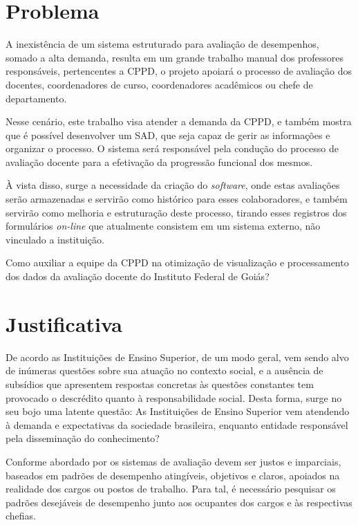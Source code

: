       
      
\section{Problema}
    A inexistência de um sistema estruturado para avaliação de desempenhos, somado a alta demanda, resulta em um grande trabalho manual dos professores responsáveis, pertencentes a CPPD, o projeto apoiará o processo de avaliação dos docentes, coordenadores de curso, coordenadores acadêmicos ou chefe de departamento.
    
    Nesse cenário, este trabalho visa atender a demanda da CPPD, e também mostra que é possível desenvolver um SAD, que seja capaz de gerir as informações e organizar o processo. O sistema será responsável pela condução do processo de avaliação docente para a efetivação da progressão funcional dos mesmos.
    
    À vista disso, surge a necessidade da criação do \textit{software}, onde estas avaliações serão armazenadas e servirão como histórico para esses colaboradores, e também servirão como melhoria e estruturação deste processo, tirando esses registros dos formulários \textit{on-line} que atualmente consistem em um sistema externo, não vinculado a instituição.
    
    Como auxiliar a equipe da CPPD na otimização de visualização e processamento dos dados da avaliação docente do Instituto Federal de Goiás?


\section{Justificativa}
    De acordo  as Instituições de Ensino Superior, de um modo geral, vem sendo alvo de inúmeras questões sobre sua atuação no contexto social, e a ausência de subsídios que apresentem respostas concretas às questões constantes tem provocado o descrédito quanto à responsabilidade social. Desta forma, surge no seu bojo uma latente questão: As Instituições de Ensino Superior vem atendendo à demanda e expectativas da sociedade brasileira, enquanto entidade responsável pela disseminação do conhecimento? 
    
    Conforme abordado por  os sistemas de avaliação devem ser justos e imparciais, baseados em padrões de desempenho atingíveis, objetivos e claros, apoiados na realidade dos cargos ou postos de trabalho. Para tal, é necessário pesquisar os padrões desejáveis de desempenho junto aos ocupantes dos cargos e às respectivas chefias.
    

